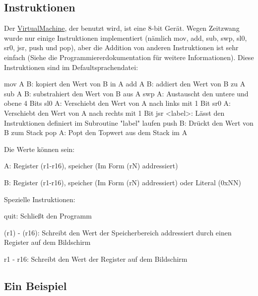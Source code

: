 \subsection*{Instruktionen}

Der \mbox{\hyperlink{class_virtual_machine}{Virtual\+Machine}}, der benutzt wird, ist eine 8-\/bit Gerät. Wegen Zeitzwang wurde nur einige Instruktionen implementiert (nämlich mov, add, sub, swp, sl0, sr0, jsr, push und pop), aber die Addition von anderen Instruktionen ist sehr einfach (Siehe die Programmiererdokumentation für weitere Informationen). Diese Instruktionen sind im Defaultsprachendatei\+: 
\begin{DoxyCode}
mov A B: kopiert den Wert von B in A
add A B: addiert den Wert von B zu A
sub A B: substrahiert den Wert von B aus A
swp A: Austauscht den untere und obene 4 Bits
sl0 A: Verschiebt den Wert von A nach links mit 1 Bit
sr0 A: Verschiebt den Wert von A nach rechts mit 1 Bit
jsr <label>: Lässt den Instruktionen definiert im Subroutine "label" laufen 
push B: Drückt den Wert von B zum Stack
pop A: Popt den Topwert aus dem Stack im A 
\end{DoxyCode}
 Die Werte können sein\+:
\begin{DoxyItemize}
\item A\+: Register (r1-\/r16), speicher (Im Form (rN) addressiert)
\item B\+: Register (r1-\/r16), speicher (Im Form (rN) addressiert) oder Literal (0x\+NN)
\end{DoxyItemize}

Spezielle Instruktionen\+:
\begin{DoxyItemize}
\item {\ttfamily quit}\+: Schließt den Programm
\item {\ttfamily (r1)} -\/ {\ttfamily (r16)}\+: Schreibt den Wert der Speicherbereich addressiert durch einen Register auf dem Bildschirm
\item {\ttfamily r1} -\/ {\ttfamily r16}\+: Schreibt den Wert der Register auf dem Bildschirm
\end{DoxyItemize}

\subsection*{Ein Beispiel}

